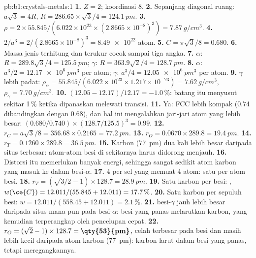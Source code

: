 \begin{solution}{pb:b1:crystals-metals:1}
\textbf{1.} $Z = 2$; koordinasi 8.
\textbf{2.} Sepanjang diagonal ruang: $a\sqrt3 = 4R$, $R = 286.65 \times
\sqrt3/4 = \qty{124.1}{pm}$.
\textbf{3.} $\rho = 2 \times 55.845/(6.022 \times 10^{23} \times (2.8665
\times 10^{-8})^3) = \qty{7.87}{g/cm^3}$.
\textbf{4.} $2/a^3 = 2/(2.8665 \times 10^{-8})^3 = \num{8.49e22}$ atom.
\textbf{5.} $C = \pi\sqrt3/8 = 0.680$.
\textbf{6.} Massa jenis terhitung dan terukur cocok sampai tiga angka.
\textbf{7.} $\alpha$: $R = 289.8\sqrt3/4 = \qty{125.5}{pm}$; $\gamma$:
$R = 363.9\sqrt2/4 = \qty{128.7}{pm}$.
\textbf{8.} $\alpha$: $a^3/2 = \qty{12.17e6}{pm^3}$ per atom; $\gamma$:
$a^3/4 = \qty{12.05e6}{pm^3}$ per atom.
\textbf{9.} $\gamma$ lebih padat: $\rho_\alpha = 55.845/(6.022 \times 10^{23}
\times 1.217 \times 10^{-23}) = \qty{7.62}{g/cm^3}$, $\rho_\gamma =
\qty{7.70}{g/cm^3}$.
\textbf{10.} $(12.05 - 12.17)/12.17 = -1.0\,\%$: batang itu menyusut
sekitar 1\,\% ketika dipanaskan melewati transisi.
\textbf{11.} Ya: FCC lebih kompak (0.74 dibandingkan dengan 0.68), dan
hal ini mengalahkan jari-jari atom yang lebih besar:
$(0.680/0.740) \times (128.7/125.5)^3 = 0.99$.
\textbf{12.} $r_C = a\sqrt3/8 = 356.68 \times 0.2165 = \qty{77.2}{pm}$.
\textbf{13.} $r_O = 0.0670 \times 289.8 = \qty{19.4}{pm}$.
\textbf{14.} $r_T = 0.1260 \times 289.8 = \qty{36.5}{pm}$.
\textbf{15.} Karbon (\qty{77}{pm}) dua kali lebih besar daripada situs
terbesar: atom-atom besi di sekitarnya harus didorong menjauh.
\textbf{16.} Distorsi itu memerlukan banyak energi, sehingga sangat
sedikit atom karbon yang masuk ke dalam besi-$\alpha$.
\textbf{17.} 4  per sel yang memuat 4 atom: satu per atom
besi.
\textbf{18.} $r_T = (\sqrt{3/2} - 1) \times 128.7 = \qty{28.9}{pm}$.
\textbf{19.} Satu karbon per besi: , $w(\ce{C}) = 12.011/(55.845 +
12.011) = 17.7\,\%$.
\textbf{20.} Satu karbon per sepuluh besi: $w = 12.011/(558.45 + 12.011) =
2.1\,\%$.
\textbf{21.}  besi-$\gamma$ jauh lebih besar daripada
situs mana pun pada besi-$\alpha$: besi yang panas melarutkan karbon,
yang kemudian terperangkap oleh pencelupan cepat.
\textbf{22.} $r_O = (\sqrt2 - 1) \times 128.7 = \textbf{\qty{53}{pm}}$,
celah terbesar pada besi dan masih lebih kecil daripada atom karbon
(\qty{77}{pm}): karbon larut dalam besi yang panas, tetapi meregangkannya.
\end{solution}

